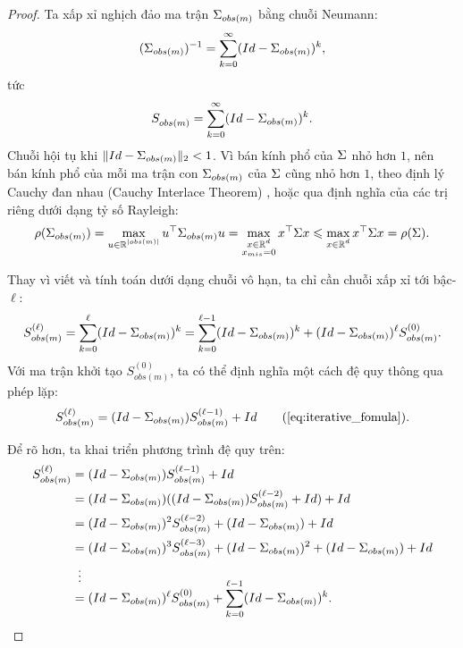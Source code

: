 \begin{proof}
    Ta xấp xỉ nghịch đảo ma trận $\Sigma_{obs(m)}$ bằng chuỗi Neumann:
    \[
        (\Sigma_{obs(m)})^{-1} = \sum_{k=0}^{\infty} (Id - \Sigma_{obs(m)})^k,
    \]
    tức 
    \[
        S^{}_{obs(m)} = \sum_{k=0}^{\infty} (Id - \Sigma_{obs(m)})^k.
    \]
    Chuỗi hội tụ khi $\|Id - \Sigma_{obs(m)}\|_2 < 1$. Vì bán kính phổ của $\Sigma$ nhỏ hơn $1$, nên bán kính phổ của mỗi ma trận con $\Sigma_{obs(m)}$ của $\Sigma$ cũng nhỏ hơn $1$, theo định lý Cauchy đan nhau (Cauchy Interlace Theorem) \cite{cauchyinterlacetheorem}, hoặc qua định nghĩa của các trị riêng dưới dạng tỷ số Rayleigh:
    \[
        \rho(\Sigma_{obs(m)}) 
        = \max_{\substack{u \in \mathbb R^{|obs(m)|}}} u^{\top} \Sigma_{obs(m)} u 
        = \max_{\substack{x \in \mathbb R^{d} \\ x_{mis}=0}} x^{\top} \Sigma x 
        \leqslant \max_{\substack{x \in \mathbb R^{d}}} x^{\top} \Sigma x 
        = \rho(\Sigma).
    \]
    
    Thay vì viết và tính toán dưới dạng chuỗi vô hạn, ta chỉ cần chuỗi xấp xỉ tới bậc-$\ell$:
    \[
        S^{(\ell)}_{obs(m)} = \sum_{k=0}^{\ell} (Id - \Sigma_{obs(m)})^k 
        = \sum_{k=0}^{\ell-1} (Id - \Sigma_{obs(m)})^k + (Id - \Sigma_{obs(m)})^{\ell}S^{(0)}_{obs(m)}.
    \]
    Với ma trận khởi tạo $S_{obs(m)}^{(0)}$, ta có thể định nghĩa một cách đệ quy thông qua phép lặp:
    \begin{equation*}
        S^{(\ell)}_{obs(m)} = (Id - \cov_{obs(m)} )S^{(\ell-1)}_{obs(m)} + Id \tag{\ref{eq:iterative_fomula}}.
    \end{equation*}

    Để rõ hơn, ta khai triển phương trình đệ quy trên:
    \begin{align*}
        S^{(\ell)}_{obs(m)} 
        &= (Id - \cov_{obs(m)})S^{(\ell-1)}_{obs(m)} + Id \\
        &= (Id - \cov_{obs(m)})((Id - \cov_{obs(m)})S^{(\ell-2)}_{obs(m)} + Id)  + Id \\
        &= (Id - \cov_{obs(m)})^2S^{(\ell-2)}_{obs(m)} + (Id - \cov_{obs(m)})  + Id \\
        &= (Id - \cov_{obs(m)})^3S^{(\ell-3)}_{obs(m)} + (Id - \cov_{obs(m)})^2 + (Id - \cov_{obs(m)})  + Id \\
        & \vdotswithin{=} \\[-10pt] %
        &= (Id - \cov_{obs(m)})^{\ell}S^{(0)}_{obs(m)} + \sum_{k=0}^{\ell-1}(Id - \cov_{obs(m)})^k.
    \end{align*}


\end{proof}
